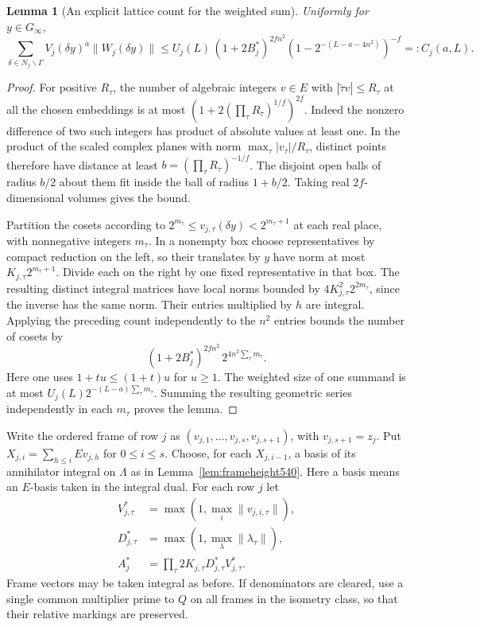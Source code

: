 \documentclass[a4paper,11pt]{article}
\newtheorem{lemma}[proposition]{Lemma}
\theoremstyle{definition}
\theoremstyle{remark}
\numberwithin{equation}{section}
\begin{document}
\begin{lemma}[An explicit lattice count for the weighted sum]
\leavevmode\label{lem:packing541}
Uniformly for \(y\in G_\infty\),
\[
 \sum_{\delta\in N_j\backslash\Gamma}
       V_j(\delta y)^a\|W_j(\delta y)\|
   \le U_j(L)\,(1+2B_j^*)^{2fn^2}
                  (1-2^{-(L-a-4n^2)})^{-f}=: C_j(a,L).
\]
\end{lemma}
\begin{proof}
For positive \(R_\tau\), the number of algebraic integers
\(v\in E\) with \(|\widetilde\tau v|\le R_\tau\) at all the
chosen embeddings is at most
\((1+2(\prod_\tau R_\tau)^{1/f})^{2f}\).
Indeed the nonzero difference of two such integers has product
of absolute values at least one. In the product of the scaled
complex planes with norm \(\max_\tau |v_\tau|/R_\tau\), distinct
points therefore have distance at least
\(b=(\prod_\tau R_\tau)^{-1/f}\).
The disjoint open balls of radius \(b/2\) about them fit inside
the ball of radius \(1+b/2\). Taking real \(2f\)-dimensional
volumes gives the bound.

Partition the cosets according to
\(2^{m_\tau}\le v_{j,\tau}(\delta y)<2^{m_\tau+1}\) at each
real place, with nonnegative integers \(m_\tau\).
In a nonempty box choose representatives by compact reduction
on the left, so their translates by \(y\) have norm at most
\(K_{j,\tau}2^{m_\tau+1}\). Divide each on the right by one
fixed representative in that box. The resulting distinct
integral matrices have local norms bounded by
\(4K_{j,\tau}^2 2^{2m_\tau}\), since the inverse has the same
norm. Their entries multiplied by \(h\) are integral. Applying
the preceding count independently to the \(n^2\) entries
bounds the number of cosets by
\[
           (1+2B_j^*)^{2fn^2}\,2^{4n^2\sum_\tau m_\tau}.
\]
Here one uses \(1+tu\le(1+t)u\) for \(u\ge1\).
The weighted size of one summand is at most
\(U_j(L)2^{-(L-a)\sum_\tau m_\tau}\).
Summing the resulting geometric series independently in each
\(m_\tau\) proves the lemma.
\end{proof}

Write the ordered frame of row \(j\) as
\((v_{j,1},\ldots,v_{j,s},v_{j,s+1})\), with \(v_{j,s+1}=z_j\).
Put \(X_{j,i}=\sum_{h\le i}Ev_{j,h}\) for \(0\le i\le s\).
Choose, for each \(X_{j,i-1}\), a basis of its annihilator
integral on \(\Lambda\) as in Lemma~\ref{lem:frameheight540}.
Here a basis means an \(E\)-basis taken in the integral dual.
For each row \(j\) let
\[
 \begin{split}
 V_{j,\tau}^*&=\max(1,\max_i\|v_{j,i,\tau}\|),\\
 D_{j,\tau}^*&=\max(1,\max_\lambda\|\lambda_\tau\|),\\
 A_j^*&=\prod_\tau 2K_{j,\tau}D_{j,\tau}^*V_{j,\tau}^* .
 \end{split}
\]
Frame vectors may be taken integral as before. If denominators
are cleared, use a single common multiplier prime to \(Q\)
on all frames in the isometry class, so that their relative
markings are preserved.
\end{document}

